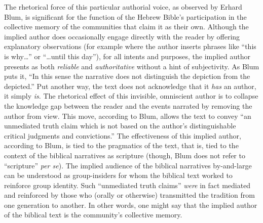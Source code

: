  The rhetorical force of this particular authorial voice, as observed by Erhard Blum, is significant for the function of the Hebrew Bible's participation in the collective memory of the communities that claim it as their own. Although the implied author does occasionally engage directly with the reader by offering explanatory observations (for example where the author inserts phrases like ``this is why\ldots{}'' or ``\ldots{}until this day''), for all intents and purposes, the implied author presents as both \emph{reliable} and \emph{authoritative} without a hint of subjectivity. As Blum puts it, ``In this sense the narrative does not distinguish the depiction from the depicted.''\autocite[33]{blum_barton-etal2007} Put another way, the text does not acknowledge that it \emph{has} an author, it simply \emph{is}. The rhetorical effect of this invisible, omniscient author is to collapse the knowledge gap between the reader and the events narrated by removing the author from view. This move, according to Blum, allows the text to convey ``an unmediated truth claim which is not based on the author's distinguishable critical judgments and convictions.''\autocite[33]{blum_barton-etal2007} The effectiveness of this implied author, according to Blum, is tied to the pragmatics of the text, that is, tied to the context of the biblical narratives as scripture (though, Blum does not refer to ``scripture'' \emph{per se}). The implied audience of the biblical narratives by-and-large can be understood as group-insiders for whom the biblical text worked to reinforce group identity. Such ``unmediated truth claims'' \emph{were} in fact mediated and reinforced by those who (orally or otherwise) transmitted the tradition from one generation to another.\autocite[33]{blum_barton-etal2007} In other words, one might say that the implied author of the biblical text is the community's collective memory.\autocite[Blum writes, ``If we assume that the traditional literature was primarily transmitted through oral means, than the narrator who is speaking supplies the material with a personal presence; he is not present as an author who judges and evaluates his sources from a critical distance, but as a `transmitter' who participates in the tradition itself and is able to lend it credence through his own personality, his standing, and/or his office.''][33]{blum_barton-etal2007}

